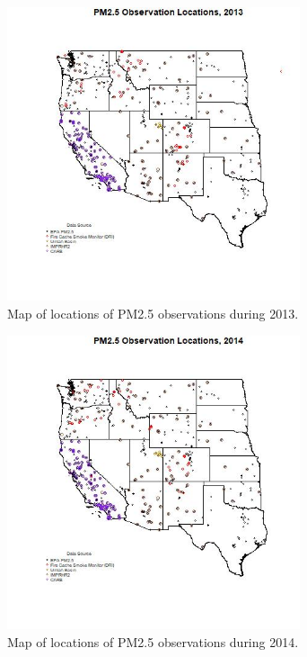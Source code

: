 \begin{figure} 
\centering 
\includegraphics[width=0.77\textwidth]{Code_Outputs/MapPM25_All_Sitesplot_year2013.jpg} 
\caption{\label{fig:MapPM25Loc2013}Map of locations of PM2.5 observations during 2013.} 
\end{figure} 
 

\begin{figure} 
\centering 
\includegraphics[width=0.77\textwidth]{Code_Outputs/MapPM25_All_Sitesplot_year2014.jpg} 
\caption{\label{fig:MapPM25Loc2014}Map of locations of PM2.5 observations during 2014.} 
\end{figure} 
 
